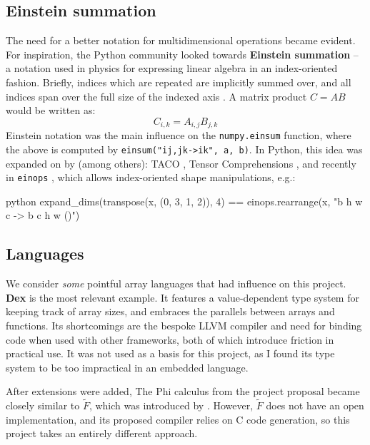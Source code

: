 \subsection{Einstein summation}

The need for a better notation for multidimensional operations became evident. For inspiration, the Python community looked towards \textbf{Einstein summation} -- a notation used in physics for expressing linear algebra in an index-oriented fashion. Briefly, indices which are repeated are implicitly summed over, and all indices span over the full size of the indexed axis \cite{aahlander2002einstein}. A matrix product $C = AB$ would be written as:
$$ C_{i,k} = A_{i,j} B_{j,k} $$
Einstein notation was the main influence on the \texttt{numpy.einsum} function, where the above is computed by \texttt{einsum("ij,jk->ik", a, b)}. In Python, this idea was expanded on by (among others): TACO \cite{kjolstad2017tensor}, Tensor Comprehensions \cite{vasilache2018tensor}, and recently in \texttt{einops} \cite{rogozhnikov2021einops}, which allows index-oriented shape manipulations, e.g.:
\begin{center}
\begin{cminted}{python}
expand_dims(transpose(x, (0, 3, 1, 2)), 4) == einops.rearrange(x, "b h w c -> b c h w ()")
\end{cminted}
\end{center}


\subsection{Languages}

We consider \textit{some} pointful array languages that had influence on this project. \textbf{Dex} is the most relevant example. It features a value-dependent type system for keeping track of array sizes, and embraces the parallels between arrays and functions. Its shortcomings are the bespoke LLVM compiler and need for binding code when used with other frameworks, both of which introduce friction in practical use. It was not used as a basis for this project, as I found its type system to be too impractical in an embedded language.

After extensions were added, The Phi calculus from the project proposal became closely similar to $\tilde F$, which was introduced by \textcite{shaikhha2019efficient}. However, $\tilde F$ does not have an open implementation, and its proposed compiler relies on C code generation, so this project takes an entirely different approach. 

